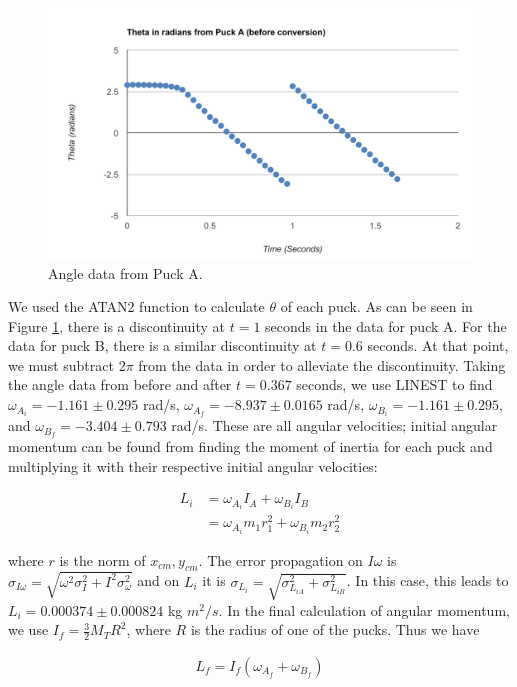 \documentclass[11pt]{article}
\begin{document}
\begin{figure}[h]
\centering
\includegraphics{theta.png}
\caption{Angle data from Puck A.}
\label{theta}
\end{figure}

We used the ATAN2 function to calculate $\theta$ of each puck. As can be seen in Figure \ref{theta}, there is a discontinuity at $t=1$ seconds in the data for puck A. For the data for puck B, there is a similar discontinuity at $t=0.6$ seconds. At that point, we must subtract $2\pi$ from the data in order to alleviate the discontinuity. Taking the angle data from before and after $t=0.367$ seconds, we use LINEST to find $\omega_{A_i}=-1.161\pm0.295$ rad/s, $\omega_{A_f} = -8.937\pm0.0165$ rad/s, $\omega_{B_i}=-1.161\pm0.295$, and $\omega_{B_f} = -3.404\pm 0.793$ rad/s. These are all angular velocities; initial angular momentum can be found from finding the moment of inertia for each puck and multiplying it with their respective initial angular velocities:

\begin{align}
L_i &= \omega_{A_i}I_A + \omega_{B_i}I_B\\
&=  \omega_{A_i}m_1 r_1^2 + \omega_{B_i}m_2 r_2^2
\end{align}

where $r$ is the norm of $x_{cm}, y_{cm}$. The error propagation on $I\omega $ is $\sigma_{I\omega} = \sqrt{\omega^2\sigma_I^2 + I^2\sigma_{\omega}^2}$ and on $L_i$ it is $\sigma_{L_i} = \sqrt{\sigma_{L_{iA}}^2+\sigma_{L_{iB}}^2}$. In this case, this leads to $L_i = 0.000374\pm 0.000824$ kg $m^2/s$. In the final calculation of angular momentum, we use $I_f=\frac{3}{2}M_TR^2$, where $R$ is the radius of one of the pucks. Thus we have

\begin{align}
L_f = I_f(\omega_{A_f}+ \omega_{B_f})
\end{align}
\end{document}
